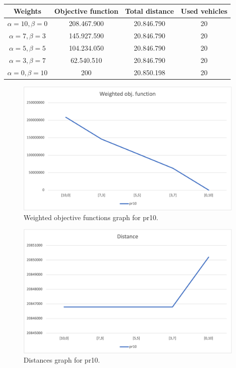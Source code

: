 {
\renewcommand{\arraystretch}{2}
\begin{longtable}[h]{| c | c | c | c |}
    \hline
    \textbf{Weights} & \textbf{Objective function} & \textbf{Total distance} & \textbf{Used vehicles} \\
    \hline
    \endhead
    $\alpha = 10, \beta = 0$ & 208.467.900 & 20.846.790 & 20 \\
    \hline
    $\alpha = 7, \beta = 3$  & 145.927.590 & 20.846.790 & 20 \\
    \hline
    $\alpha = 5, \beta = 5$  & 104.234.050 & 20.846.790 & 20 \\
    \hline
    $\alpha = 3, \beta = 7$  &  62.540.510 & 20.846.790 & 20 \\
    \hline
    $\alpha = 0, \beta = 10$ &         200 & 20.850.198 & 20 \\
    \hline
\end{longtable}
}
\begin{figure}[H]
    \centering
    \includegraphics[height=0.25\textheight]{../graphs/pr10-wobjf.png}
    \caption{Weighted objective functions graph for pr10.}
\end{figure}

\begin{figure}[H]
    \centering
    \includegraphics[height=0.25\textheight]{../graphs/pr10-distance.png}
    \caption{Distances graph for pr10.}
\end{figure}

